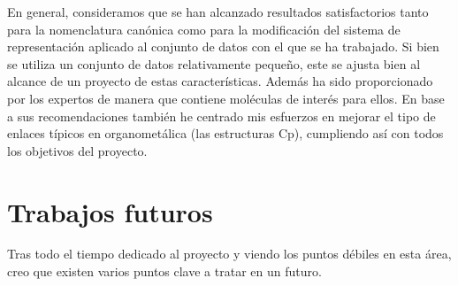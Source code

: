 En general, consideramos que se han alcanzado resultados satisfactorios tanto para la nomenclatura canónica como para la modificación del sistema de representación aplicado al conjunto de datos con el que se ha trabajado. Si bien se utiliza un conjunto de datos relativamente pequeño, este se ajusta bien al alcance de un proyecto de estas características. Además ha sido proporcionado por los expertos de manera que contiene moléculas de interés para ellos. En base a sus recomendaciones también he centrado mis esfuerzos en mejorar el tipo de enlaces típicos en organometálica (las estructuras Cp),
cumpliendo así con todos los objetivos del proyecto.




\section{Trabajos futuros}

Tras todo el tiempo dedicado al proyecto y viendo los puntos débiles en esta área, creo que existen varios puntos clave a tratar en un futuro. 

